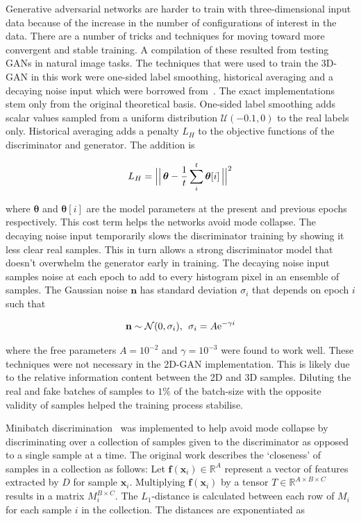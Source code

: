 \documentclass[twocolumn]{article}
\numberwithin{equation}{section}
\begin{document}
Generative adversarial networks are harder to train with three-dimensional input data because of the increase in the 
number of configurations of interest in the data. There are a number of tricks and techniques for moving toward more 
convergent and stable training. A compilation of these resulted from testing GANs in natural image tasks. The techniques 
that were used to train the 3D-GAN in this work were one-sided label smoothing, historical averaging and a decaying noise 
input which were borrowed from~\cite{gantricks_sali, gan_noise_decay}. The exact implementations stem only from the 
original theoretical basis. One-sided label smoothing adds scalar values sampled from a uniform distribution $\mathcal{U}
(-0.1,0)$ to the real labels only. Historical averaging adds a penalty $L_H$ to the objective functions of the discriminator
and generator. The addition is

\begin{equation}
    L_H = \Bigl\lvert\Bigl\lvert \, \bm{\theta} - \frac{1}{t} \sum_i^t\bm{\theta}[i] \,  \Bigr\rvert\Bigr\rvert^2
\end{equation}

where $\bm{\theta}$ and $\bm{\theta}[i]$ are the model parameters at the present and previous epochs respectively. This
cost term helps the networks avoid mode collapse. The decaying noise input temporarily slows the discriminator training
by showing it less clear real samples. This in turn allows a strong discriminator model that doesn't overwhelm the generator
early in training. The decaying noise input samples noise at each epoch to add to every histogram pixel in an ensemble of
samples. The Gaussian noise $\mathbf{n}$ has standard deviation $\sigma_i$ that depends on epoch $i$ such that 

\begin{equation}
    \mathbf{n} \sim \mathcal{N}(0,\sigma_i), \: \: \sigma_i = A \textup{e}^{-\gamma i}
\end{equation}

where the free parameters $A=10^{-2}$ and $\gamma=10^{-3}$ were found to work well. These techniques were not necessary in 
the 2D-GAN implementation. This is likely due to the relative information content between the 2D and 3D samples. Diluting 
the real and fake batches of samples to $1\%$ of the batch-size with the opposite validity of samples helped the training 
process stabilise.

Minibatch discrimination~\cite{gantricks_sali} was implemented to help avoid mode collapse by discriminating over a 
collection of samples given to the discriminator as opposed to a single sample at a time. The original work describes 
the `closeness' of samples in a collection as follows: Let $\mathbf{f}(\bm{x}_i) \in \mathbb{R}^A$ represent a vector of 
features extracted by $D$ for sample $\mathbf{x}_i$. Multiplying $\mathbf{f}(\bm{x}_i)$ by a tensor $T \in \mathbb{R}^{A\times 
B\times C}$ results in a matrix $M_i^{B\times C}$. The $L_1$-distance is calculated between each row of $M_i$ for each sample 
$i$ in the collection. The distances are exponentiated as
\end{document}
